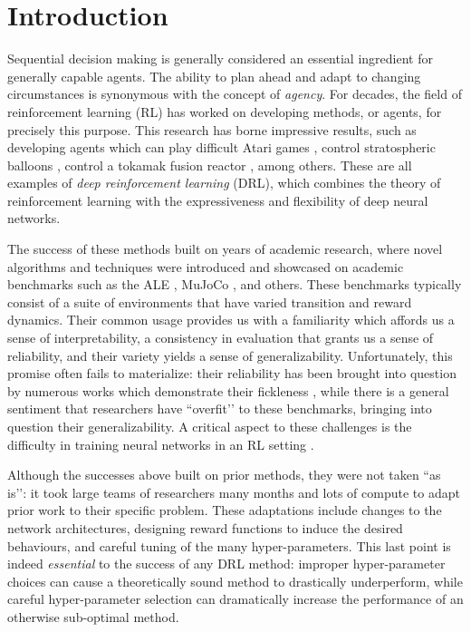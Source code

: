 \section{Introduction}
\label{sec:introduction}

Sequential decision making is generally considered an essential ingredient for generally capable agents. The ability to plan ahead and adapt to changing circumstances is synonymous with the concept of {\em agency}. For decades, the field of reinforcement learning (RL) has worked on developing methods, or agents, for precisely this purpose. This research has borne impressive results, such as developing agents which can play difficult Atari games \citep{mnih2015humanlevel}, control stratospheric balloons \citep{Bellemare2020AutonomousNO}, control a tokamak fusion reactor \citep{Degrave2022MagneticCO}, among others. These are all examples of {\em deep reinforcement learning} (DRL), which combines the theory of reinforcement learning with the expressiveness and flexibility of deep neural networks.

The success of these methods built on years of academic research, where novel algorithms and techniques were introduced and showcased on academic benchmarks such as the ALE \citep{bellemare2012ale}, MuJoCo \citep{todorov2012mujoco}, and others. These benchmarks typically consist of a suite of environments that have varied transition and reward dynamics. Their common usage provides us with a familiarity which affords us a sense of interpretability, a consistency in evaluation that grants us a sense of reliability, and their variety yields a sense of generalizability. Unfortunately, this promise often fails to materialize: their reliability has been brought into question by numerous works which demonstrate their fickleness \citep{Henderson2017DeepRL,agarwal2021deep}, while there is a general sentiment that researchers have ``overfit’’ to these benchmarks, bringing into question their generalizability. A critical aspect to these challenges is the difficulty in training neural networks in an RL setting \citep{ostrovski2021the,lyle2022learning,sokar2023dormant}.

Although the successes above built on prior methods, they were not taken ``as is’’: it took large teams of researchers many months and lots of compute to adapt prior work to their specific problem. These adaptations include changes to the network architectures, designing reward functions to induce the desired behaviours, and careful tuning of the many hyper-parameters. This last point is indeed {\em essential} to the success of any DRL method: improper hyper-parameter choices can cause a theoretically sound method to drastically underperform, while careful hyper-parameter selection can dramatically increase the performance of an otherwise sub-optimal method.

